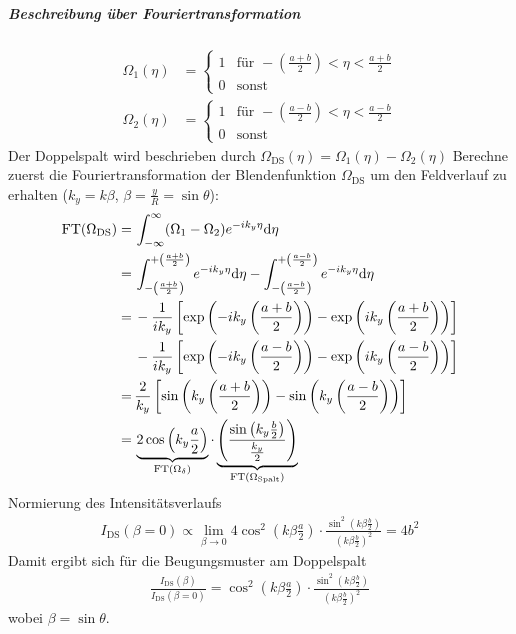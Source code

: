 \subparagraph{Beschreibung über Fouriertransformation}
\begin{align*}
  \Omega_1(\eta) 
  &= \begin{cases}
    1 & \text{für } 
    -\left(\frac{a+b}{2}\right) < \eta < \frac{a+b}{2}\\
    0 & \text{sonst}
  \end{cases}\\
  \Omega_2(\eta) 
  &= \begin{cases}
    1 & \text{für } 
    -\left(\frac{a-b}{2}\right) < \eta < \frac{a-b}{2}\\
    0 & \text{sonst}
  \end{cases}    
\end{align*}
Der Doppelspalt wird beschrieben durch 
$\Omega_\text{DS}(\eta)=\Omega_1(\eta)-\Omega_2(\eta)$
Berechne zuerst die Fouriertransformation der Blendenfunktion
$\Omega_\text{DS}$ um den Feldverlauf zu erhalten
($k_y=k\beta$, $\beta=\frac{y}{R}=\sin\theta$):
\begin{align*}
  \operatorname{FT}(\Omega_\text{DS}) 
  =\, &\int_{-\infty}^{\infty} 
        (\Omega_1-\Omega_2) e^{-ik_y\eta} \mathrm{d}\eta \\
  =\, &\int_{-\left(\frac{a+b}{2}\right)}^{+\left(\frac{a+b}{2}\right)}
        e^{-ik_y\eta} \mathrm{d}\eta 
        -  \int_{-\left(\frac{a-b}{2}\right)}^{+\left(\frac{a-b}{2}\right)}
        e^{-ik_y\eta} \mathrm{d}\eta \\
  =\, &-\frac{1}{ik_y} \left[
        \exp\left( -ik_y\left(\frac{a+b}{2}\right) \right)
        -\exp\left( ik_y\left(\frac{a+b}{2}\right) \right)
        \right]\\
      &-\frac{1}{ik_y} \left[
        \exp\left( -ik_y\left(\frac{a-b}{2}\right) \right)
        -\exp\left( ik_y\left(\frac{a-b}{2}\right) \right)
        \right]\\
  =\, &\frac{2}{k_y}\left[
        \sin\left(  k_y\left(\frac{a+b}{2}\right) \right)
        -\sin\left( k_y\left(\frac{a-b}{2}\right) \right)
        \right] \\
  =\, &\underbrace{ 2\cos\left( k_y\frac{a}{2} \right) }_{\operatorname{FT}(\Omega_\delta)}
        \cdot \underbrace{ \left(
        \frac{ \sin\left( k_y\frac{b}{2} \right) }{ \frac{k_y}{2} }
        \right) }_{\operatorname{FT}(\Omega_\text{Spalt})}
\end{align*}
Normierung des Intensitätsverlaufs
\begin{gather*}
  I_\text{DS}(\beta=0) 
  \propto \lim_{\beta\to 0} 
  4\cos^2\left( k\beta\frac{a}{2} \right)
  \cdot \frac
  { \sin^2\left( k\beta\frac{b}{2} \right) }
  { \left(k\beta\frac{b}{2}\right)^2 }
  = 4b^2
\end{gather*}
Damit ergibt sich für die Beugungsmuster am Doppelspalt
\begin{gather*}
  \frac{ I_\text{DS}(\beta) }{ I_\text{DS}(\beta=0) }
  = \cos^2\left( k\beta\frac{a}{2} \right)
  \cdot \frac
  { \sin^2\left( k\beta\frac{b}{2} \right) }
  {       \left( k\beta\frac{b}{2} \right)^2 }
\end{gather*}
wobei $\beta=\sin\theta$.

